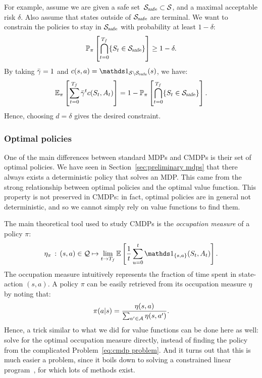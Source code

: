 		\begin{example} \label{ex:chance constraints}
			For example, assume we are given a safe set~$\S_\text{safe}\subset\S$, and a maximal acceptable risk $\delta$. Also assume that states outside of $\S_\text{safe}$ are terminal. We want to constrain the policies to stay in $\S_\text{safe}$ with probability at least $1 - \delta$:
			\begin{equation*}
				\P_\pi\left[\bigcap_{t=0}^\Tf\{S_t\in\S_\text{safe}\}\right] \geq 1 - \delta.
			\end{equation*}
			By taking $\gammabar = 1$ and $c(s, a) = \indicator_{\S\setminus\S_\text{safe}}(s)$, we have:
			\begin{equation*}
			\expected_\pi\left[\sum_{t=0}^\Tf\gammabar^tc(S_t, A_t)\right] = 1 - \P_\pi\left[\bigcap_{t=0}^\Tf\{S_t\in\S_\text{safe}\}\right].
			\end{equation*}
			Hence, choosing $d = \delta$ gives the desired constraint.
		\end{example} 
		\subsubsection{Optimal policies}
		One of the main differences between standard MDPs and CMDPs is their set of optimal policies. We have seen in Section~\ref{sec:preliminary mdps} that there always exists a deterministic policy that solves an MDP. This came from the strong relationship between optimal policies and the optimal value function. This property is not preserved in CMDPs: in fact, optimal policies are in general not deterministic, and so we cannot simply rely on value functions to find them.\par
		The main theoretical tool used to study CMDPs is the\emph{ occupation measure} of a policy $\pi$:
		\begin{equation}
			\eta_\pi\,:\,(s, a)\in\Q\mapsto \lim_{t\to\Tf}\expected\left[\frac{1}{t}\sum_{u=0}^t\indicator_{\{s, a\}}(S_t, A_t)\right].
		\end{equation}
		The occupation measure intuitively represents the fraction of time spent in state-action $(s, a)$. A policy $\pi$ can be easily retrieved from its occupation measure $\eta$ by noting that:
		\begin{equation}
			\pi(a|s) = \frac{\eta(s, a)}{\sum_{a'\in\A}\eta(s, a')}.
		\end{equation}
		Hence, a trick similar to what we did for value functions can be done here as well: solve for the optimal occupation measure directly, instead of finding the policy from the complicated Problem~\eqref{eq:cmdp problem}. And it turns out that this is much easier a problem, since it boils down to solving a constrained linear program~\cite[Theorem\,3.3]{altman1999constrained}, for which lots of methods exist.
		
